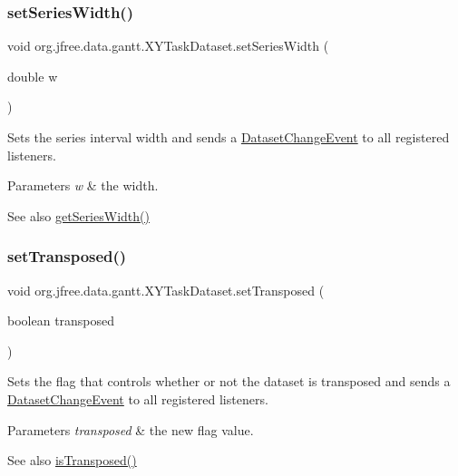 \subsubsection{\texorpdfstring{set\+Series\+Width()}{setSeriesWidth()}}
{\footnotesize\ttfamily void org.\+jfree.\+data.\+gantt.\+X\+Y\+Task\+Dataset.\+set\+Series\+Width (\begin{DoxyParamCaption}\item[{double}]{w }\end{DoxyParamCaption})}

Sets the series interval width and sends a \mbox{\hyperlink{}{Dataset\+Change\+Event}} to all registered listeners.


\begin{DoxyParams}{Parameters}
{\em w} & the width.\\
\hline
\end{DoxyParams}
\begin{DoxySeeAlso}{See also}
\mbox{\hyperlink{classorg_1_1jfree_1_1data_1_1gantt_1_1_x_y_task_dataset_ab358434afb5a7ceb22e72c08a07115b1}{get\+Series\+Width()}} 
\end{DoxySeeAlso}
\mbox{\label{classorg_1_1jfree_1_1data_1_1gantt_1_1_x_y_task_dataset_ac784b2fb23128cc85b9d4c14dd762d3a}} 
\subsubsection{\texorpdfstring{set\+Transposed()}{setTransposed()}}
{\footnotesize\ttfamily void org.\+jfree.\+data.\+gantt.\+X\+Y\+Task\+Dataset.\+set\+Transposed (\begin{DoxyParamCaption}\item[{boolean}]{transposed }\end{DoxyParamCaption})}

Sets the flag that controls whether or not the dataset is transposed and sends a \mbox{\hyperlink{}{Dataset\+Change\+Event}} to all registered listeners.


\begin{DoxyParams}{Parameters}
{\em transposed} & the new flag value.\\
\hline
\end{DoxyParams}
\begin{DoxySeeAlso}{See also}
\mbox{\hyperlink{classorg_1_1jfree_1_1data_1_1gantt_1_1_x_y_task_dataset_ab3ff49031eb07439efcdb9b14d470cb3}{is\+Transposed()}} 
\end{DoxySeeAlso}


